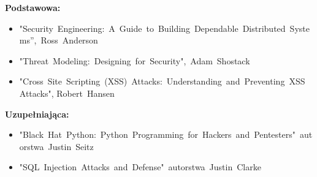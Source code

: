 \documentclass[12pt, a4paper]{article}
\begin{document}
\textbf{Podstawowa:}
\begin{itemize}
  \item "Security Engineering: A Guide to Building Dependable Distributed Systems”, Ross Anderson
  \item "Threat Modeling: Designing for Security", Adam Shostack
  \item "Cross Site Scripting (XSS) Attacks: Understanding and Preventing XSS Attacks", Robert Hansen
\end{itemize}

\textbf{Uzupełniająca:}
\begin{itemize}
  \item "Black Hat Python: Python Programming for Hackers and Pentesters" autorstwa Justin Seitz
  \item "SQL Injection Attacks and Defense" autorstwa Justin Clarke
\end{itemize}
\end{document}
